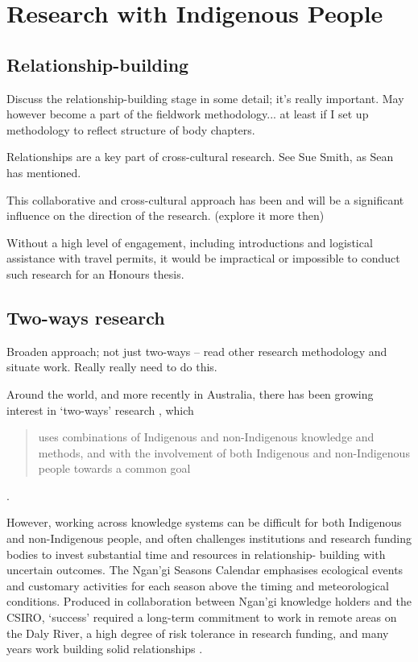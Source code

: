 \section{Research with Indigenous People}


\subsection{Relationship-building}
Discuss the relationship-building stage in some detail; it's really important.
May however become a part of the fieldwork methodology... at least if I set up
methodology to reflect structure of body chapters.


Relationships are a key part of cross-cultural research.  See Sue Smith, as 
Sean has mentioned.

This collaborative and cross-cultural approach has been and will be a 
significant influence on the direction of the research. (explore it more then)

Without a high level of engagement, including introductions and logistical
assistance with travel permits, it would be impractical or impossible to conduct
such research for an Honours thesis.


\subsection{Two-ways research}
Broaden approach; not just two-ways – read other research methodology and 
situate work.  Really really need to do this.

Around the world, and more recently in Australia, there has been growing 
interest in `two-ways' research \citep{turner2009,prober2011}, 
which \blockquote{uses combinations of Indigenous and non-Indigenous knowledge and 
methods, and with the involvement of both Indigenous and non-Indigenous people 
towards a common goal} \citep{ens2014}.  

However, working across knowledge systems can be difficult for both Indigenous 
and non-Indigenous people, and often challenges institutions and research 
funding bodies to invest substantial time and resources in relationship-
building with uncertain outcomes.  The Ngan'gi Seasons Calendar emphasises 
ecological events and customary activities for each season above the timing and 
meteorological conditions.  Produced in collaboration between Ngan'gi knowledge 
holders and the CSIRO, `success' required a long-term commitment to work in 
remote areas on the Daly River, a high degree of risk tolerance in 
research funding, and many years work building solid relationships \citep{woodward2010}.

